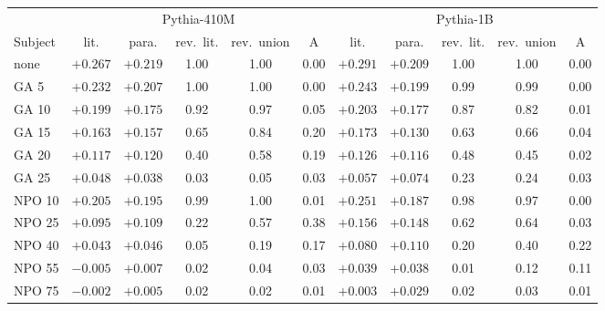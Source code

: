 \begin{tabular}{l ccccc ccccc}
\toprule
 & \multicolumn{5}{c}{Pythia-410M} & \multicolumn{5}{c}{Pythia-1B} \\
\cmidrule(lr){2-6}\cmidrule(lr){7-11}
Subject & lit. & para. & rev.\ lit. & rev.\ union & A & lit. & para. & rev.\ lit. & rev.\ union & A \\
\midrule
none & $+0.267$ & $+0.219$ & 1.00 & 1.00 & 0.00 & $+0.291$ & $+0.209$ & 1.00 & 1.00 & 0.00 \\
GA 5 & $+0.232$ & $+0.207$ & 1.00 & 1.00 & 0.00 & $+0.243$ & $+0.199$ & 0.99 & 0.99 & 0.00 \\
GA 10 & $+0.199$ & $+0.175$ & 0.92 & 0.97 & 0.05 & $+0.203$ & $+0.177$ & 0.87 & 0.82 & 0.01 \\
GA 15 & $+0.163$ & $+0.157$ & 0.65 & 0.84 & 0.20 & $+0.173$ & $+0.130$ & 0.63 & 0.66 & 0.04 \\
GA 20 & $+0.117$ & $+0.120$ & 0.40 & 0.58 & 0.19 & $+0.126$ & $+0.116$ & 0.48 & 0.45 & 0.02 \\
GA 25 & $+0.048$ & $+0.038$ & 0.03 & 0.05 & 0.03 & $+0.057$ & $+0.074$ & 0.23 & 0.24 & 0.03 \\
NPO 10 & $+0.205$ & $+0.195$ & 0.99 & 1.00 & 0.01 & $+0.251$ & $+0.187$ & 0.98 & 0.97 & 0.00 \\
NPO 25 & $+0.095$ & $+0.109$ & 0.22 & 0.57 & 0.38 & $+0.156$ & $+0.148$ & 0.62 & 0.64 & 0.03 \\
NPO 40 & $+0.043$ & $+0.046$ & 0.05 & 0.19 & 0.17 & $+0.080$ & $+0.110$ & 0.20 & 0.40 & 0.22 \\
NPO 55 & $-0.005$ & $+0.007$ & 0.02 & 0.04 & 0.03 & $+0.039$ & $+0.038$ & 0.01 & 0.12 & 0.11 \\
NPO 75 & $-0.002$ & $+0.005$ & 0.02 & 0.02 & 0.01 & $+0.003$ & $+0.029$ & 0.02 & 0.03 & 0.01 \\
\bottomrule
\end{tabular}
